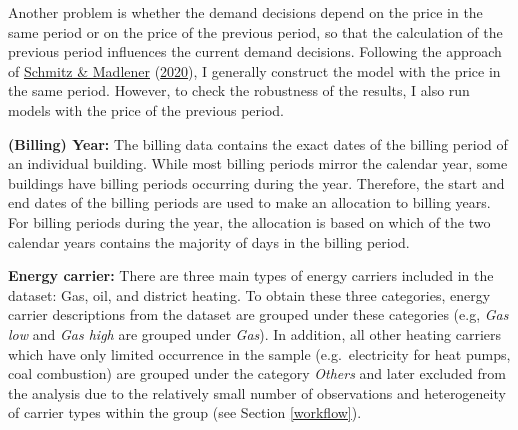 \documentclass[12pt,twoside]{reedthesis}
\begin{document}
Another problem is whether the demand decisions depend on the price in the same period or on the price of the previous period, so that the calculation of the previous period influences the current demand decisions. Following the approach of \protect\hyperlink{ref-schmitz_madlener20}{Schmitz \& Madlener} (\protect\hyperlink{ref-schmitz_madlener20}{2020}), I generally construct the model with the price in the same period. However, to check the robustness of the results, I also run models with the price of the previous period.

\textbf{(Billing) Year:} The billing data contains the exact dates of the billing period of an individual building. While most billing periods mirror the calendar year, some buildings have billing periods occurring during the year. Therefore, the start and end dates of the billing periods are used to make an allocation to billing years. For billing periods during the year, the allocation is based on which of the two calendar years contains the majority of days in the billing period.

\textbf{Energy carrier:} There are three main types of energy carriers included in the dataset: Gas, oil, and district heating. To obtain these three categories, energy carrier descriptions from the dataset are grouped under these categories (e.g, \emph{Gas low} and \emph{Gas high} are grouped under \emph{Gas}). In addition, all other heating carriers which have only limited occurrence in the sample (e.g.~electricity for heat pumps, coal combustion) are grouped under the category \emph{Others} and later excluded from the analysis due to the relatively small number of observations and heterogeneity of carrier types within the group (see Section \ref{workflow}).
\end{document}
